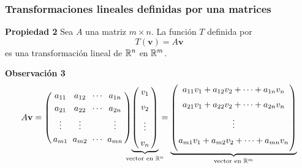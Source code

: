 {\nologo
\begin{frame}\frametitle{Transformaciones lineales definidas por una matrices}

\begin{prop}{\textbf{Propiedad 2}}
	\justifying
	Sea $A$ una matriz $m\times n$. La función $T$ definida por
	\[
		T(\mathbf{v}) = A\mathbf{v}
	\]
	es una transformación lineal de $\mathbb{R}^n$ en $\mathbb{R}^m$.

\end{prop}	

\begin{alertblock}{\textbf{Observación 3}}
	\[
	A\mathbf{v} = 
	\left(
	\begin{array}{@{\hspace{0.3\tabcolsep}}c@{\hspace{\tabcolsep}}c@{\hspace{\tabcolsep}}c@{\hspace{\tabcolsep}}c@{\hspace{0.3\tabcolsep}}}
	a_{11} & a_{12} & \cdots & a_{1n} \\[1mm]
	a_{21} & a_{22} & \cdots & a_{2n} \\[1mm]
	\vdots & \vdots &        & \vdots \\[1mm]
	a_{m1} & a_{m2} & \cdots & a_{mn} 
	\end{array}
	\right)
	\hspace{-3mm}
	\underbrace{
	\left(
	\begin{array}{@{\hspace{0.3\tabcolsep}}c@{\hspace{0.3\tabcolsep}}}
	v_1 \\[2mm]
	v_2 \\[2mm]
	\vdots \\[2mm]
	v_n
	\end{array}
	\right)
	}_{\text{vector en } \r^n}
	\hspace{-2mm} = \hspace{0mm}
	\underbrace{
	\left(
	\begin{array}{@{\hspace{0.1\tabcolsep}}c@{\hspace{0.1\tabcolsep}}}
	a_{11}v_1 + a_{12}v_2  + \cdots + a_{1n}v_n \\[2mm]
	a_{21}v_1 + a_{22}v_2  + \cdots + a_{2n}v_n \\[2mm]
	\vdots \\[2mm]
	a_{m1}v_1 + a_{m2}v_2  + \cdots + a_{mn}v_n \\[2mm]
	\end{array}
	\right)
	}_{\text{vector en } \r^m}
	\]
\end{alertblock}

\end{frame}
}

